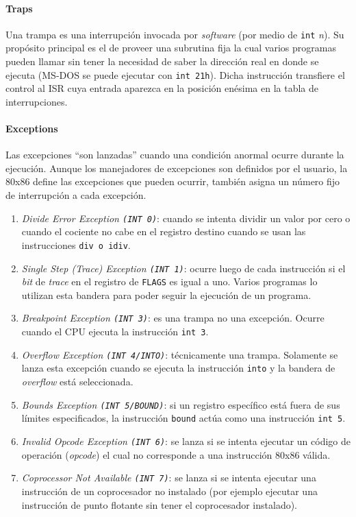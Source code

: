 \paragraph{\textnormal{\textbf{Traps}}}
Una trampa es una interrupción invocada por \textit{software} (por medio de \texttt{int} \textit{n}). Su propósito principal es el de proveer una subrutina fija la cual varios programas pueden llamar sin tener la necesidad de saber la dirección real en donde se ejecuta (MS-DOS se puede ejecutar con \texttt{int 21h}). Dicha instrucción transfiere el control al ISR cuya entrada aparezca en la posición enésima en la tabla de interrupciones. 

\paragraph{\textnormal{\textbf{Exceptions}}}
Las excepciones ``son lanzadas'' cuando una condición anormal ocurre durante la ejecución. Aunque los manejadores de excepciones son definidos por el usuario, la 80x86 define las excepciones que pueden ocurrir, también asigna un número fijo de interrupción a cada excepción.

\begin{enumerate}
    \item \textit{Divide Error Exception \texttt{(INT 0)}}: cuando se intenta dividir un valor por cero o cuando el cociente no cabe en el registro destino cuando se usan las instrucciones \texttt{div \textnormal{o} idiv}.
    \item \textit{Single Step (Trace) Exception \texttt{(INT 1)}}: ocurre luego de cada instrucción si el \textit{bit} de \textit{trace} en el registro de \texttt{FLAGS} es igual a uno. Varios programas lo utilizan esta bandera para poder seguir la ejecución de un programa.
    \item \textit{Breakpoint Exception \texttt{(INT 3)}}: es una trampa no una excepción. Ocurre cuando el CPU ejecuta la instrucción \texttt{int 3}.
    \item \textit{Overflow Exception \texttt{(INT 4/INTO)}}: técnicamente una trampa. Solamente se lanza esta excepción cuando se ejecuta la instrucción \texttt{into} y la bandera de \textit{overflow} está seleccionada.
    \item \textit{Bounds Exception \texttt{(INT 5/BOUND)}}: si un registro específico está fuera de sus límites especificados, la instrucción \texttt{bound} actúa como una instrucción \texttt{int 5}. 
    \item \textit{Invalid Opcode Exception \texttt{(INT 6)}}: se lanza si se intenta ejecutar un código de operación (\textit{opcode}) el cual no corresponde a una instrucción 80x86 válida. 
    \item \textit{Coprocessor Not Available \texttt{(INT 7)}}: se lanza si se intenta ejecutar una instrucción de un coprocesador no instalado (por ejemplo ejecutar una instrucción de punto flotante sin tener el coprocesador instalado). 
\end{enumerate}

